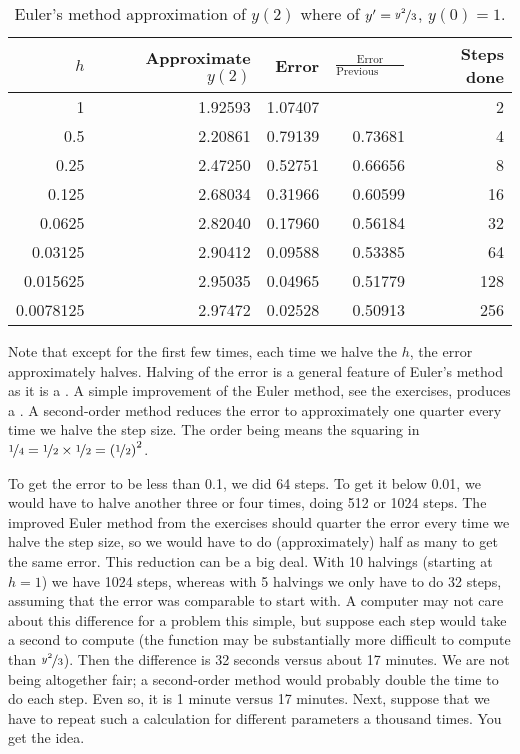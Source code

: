 \begin{table}[h!t]
\mybeginframe
\capstart
\begin{center}
\begin{tabular}{@{}rrrrr@{}}
\toprule
$h$ & Approximate $y(2)$ & Error & $\frac{\text{Error}}{\text{Previous
error}}$ & Steps done \\
\midrule
1        & 1.92593 & 1.07407 &         & 2 \\
0.5      & 2.20861 & 0.79139 & 0.73681 & 4 \\
0.25     & 2.47250 & 0.52751 & 0.66656 & 8 \\
0.125    & 2.68034 & 0.31966 & 0.60599 & 16 \\
0.0625   & 2.82040 & 0.17960 & 0.56184 & 32 \\
0.03125  & 2.90412 & 0.09588 & 0.53385 & 64 \\
0.015625 & 2.95035 & 0.04965 & 0.51779 & 128 \\
0.0078125& 2.97472 & 0.02528 & 0.50913 & 256 \\
\bottomrule
\end{tabular}
\end{center}
\caption{Euler's method approximation of $y(2)$ where
of $y'=\nicefrac{y^2}{3}$, $y(0)=1$.\label{euler-table:table}}
\myendframe
\end{table}

Note that except for the first few times, each time we halve 
the $h$, the error approximately halves.
Halving of the error is a general feature of Euler's method as it is a
\emph{}.
A simple improvement of the Euler method, see the exercises,
produces a .
A second-order method
reduces the error to approximately one
quarter every time we halve the step size.  The order being
 means the squaring in
$\nicefrac{1}{4} = \nicefrac{1}{2} \times \nicefrac{1}{2}
= {(\nicefrac{1}{2})}^2$.

To get the error to be less than 0.1, we did
64 steps.  To get it below 0.01, we would have to halve another three or
four times, doing 512 or 1024 steps.
The improved Euler method from the exercises
should quarter the
error every time we halve the step size,
so we would have to do (approximately) half as many
 to get the same error.  This reduction can be a big deal.  With 10
halvings (starting at $h=1$) we have 1024 steps, whereas with 5 halvings
we only have to do 32 steps, assuming that the error was comparable to start
with.  A computer may not care about this
difference for a problem this simple, but suppose each step would take a
second to compute (the function may be substantially more difficult to compute
than $\nicefrac{y^2}{3}$).  Then the difference is 32 seconds versus about 17 minutes.
We are not being altogether fair; a second-order method would probably
double the time to do each step.  Even so, it is 1 minute versus 17 minutes.
Next, suppose that we have to repeat such a calculation for different
parameters a thousand times.  You get the idea.

